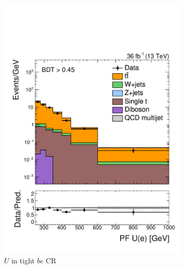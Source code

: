 \begin{figure}[]
\begin{center}
\begin{subfigure}[t]{0.32\textwidth}
            \includegraphics[width=\textwidth]{figures/monotop/prefit/singleelectrontop_tight_pfUWmag_logy.pdf}
            \caption{$U$ in tight $be$ CR}
        \end{subfigure}
        \begin{subfigure}[t]{0.32\textwidth}

\end{subfigure}
\end{center}
\end{figure}
